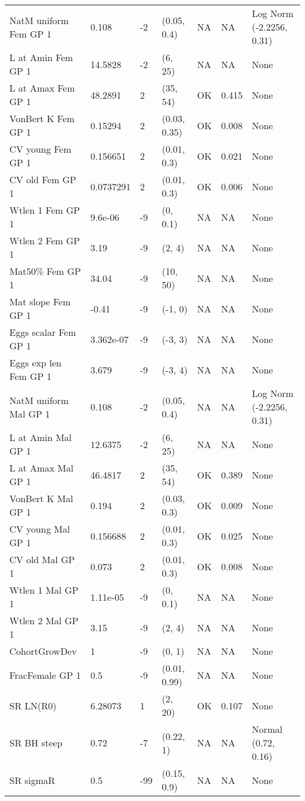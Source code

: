 \documentclass[11pt,
  letterpaper,
]{article}
\begin{document}
\begin{landscape}
\begin{longtable}[t]{>{\raggedright\arraybackslash}p{7.5cm}lllll>{\raggedright\arraybackslash}p{3.5cm}}
\endfoot
\bottomrule
\endlastfoot
NatM uniform Fem GP 1 & 0.108 & -2 & (0.05, 0.4) & NA & NA & Log Norm (-2.2256, 0.31)\\
L at Amin Fem GP 1 & 14.5828 & -2 & (6, 25) & NA & NA & None\\
L at Amax Fem GP 1 & 48.2891 & 2 & (35, 54) & OK & 0.415 & None\\
VonBert K Fem GP 1 & 0.15294 & 2 & (0.03, 0.35) & OK & 0.008 & None\\
CV young Fem GP 1 & 0.156651 & 2 & (0.01, 0.3) & OK & 0.021 & None\\
CV old Fem GP 1 & 0.0737291 & 2 & (0.01, 0.3) & OK & 0.006 & None\\
Wtlen 1 Fem GP 1 & 9.6e-06 & -9 & (0, 0.1) & NA & NA & None\\
Wtlen 2 Fem GP 1 & 3.19 & -9 & (2, 4) & NA & NA & None\\
Mat50\% Fem GP 1 & 34.04 & -9 & (10, 50) & NA & NA & None\\
Mat slope Fem GP 1 & -0.41 & -9 & (-1, 0) & NA & NA & None\\
Eggs scalar Fem GP 1 & 3.362e-07 & -9 & (-3, 3) & NA & NA & None\\
Eggs exp len Fem GP 1 & 3.679 & -9 & (-3, 4) & NA & NA & None\\
NatM uniform Mal GP 1 & 0.108 & -2 & (0.05, 0.4) & NA & NA & Log Norm (-2.2256, 0.31)\\
L at Amin Mal GP 1 & 12.6375 & -2 & (6, 25) & NA & NA & None\\
L at Amax Mal GP 1 & 46.4817 & 2 & (35, 54) & OK & 0.389 & None\\
VonBert K Mal GP 1 & 0.194 & 2 & (0.03, 0.3) & OK & 0.009 & None\\
CV young Mal GP 1 & 0.156688 & 2 & (0.01, 0.3) & OK & 0.025 & None\\
CV old Mal GP 1 & 0.073 & 2 & (0.01, 0.3) & OK & 0.008 & None\\
Wtlen 1 Mal GP 1 & 1.11e-05 & -9 & (0, 0.1) & NA & NA & None\\
Wtlen 2 Mal GP 1 & 3.15 & -9 & (2, 4) & NA & NA & None\\
CohortGrowDev & 1 & -9 & (0, 1) & NA & NA & None\\
FracFemale GP 1 & 0.5 & -9 & (0.01, 0.99) & NA & NA & None\\
SR LN(R0) & 6.28073 & 1 & (2, 20) & OK & 0.107 & None\\
SR BH steep & 0.72 & -7 & (0.22, 1) & NA & NA & Normal (0.72, 0.16)\\
SR sigmaR & 0.5 & -99 & (0.15, 0.9) & NA & NA & None\\

\end{longtable}
\end{landscape}
\end{document}
